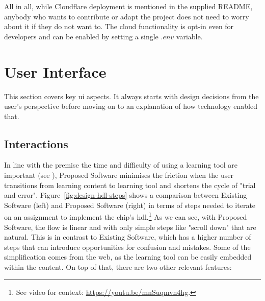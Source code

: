 All in all, while Cloudflare deployment is mentioned in the supplied README, anybody who wants to contribute or adapt the project does not need to worry about it if they do not want to.
The cloud functionality is opt-in even for developers and can be enabled by setting a single $.env$ variable.

\section{User Interface}

This section covers key \gls{ui} aspects.
It always starts with design decisions from the user's perspective before moving on to an explanation of how technology enabled that.

\subsection{Interactions}
\label{sec:ui-interactions}

In line with the premise the time and difficulty of using a learning tool are important (see ), Proposed Software minimises the friction when the user transitions from learning content to learning tool and shortens the cycle of "trial and error".
Figure~\ref{fig:design-hdl-steps} shows a comparison between Existing Software (left) and Proposed Software (right) in terms of steps needed to iterate on an assignment to implement the chip's \gls{hdl}.\footnote{See video for context: \url{https://youtu.be/mnSuqmvn4hg}.}
As we can see, with Proposed Software, the flow is linear and with only simple steps like "scroll down" that are natural.
This is in contrast to Existing Software, which has a higher number of steps that can introduce opportunities for confusion and mistakes.
Some of the simplification comes from the web, as the learning tool can be easily embedded within the content.
On top of that, there are two other relevant features:

